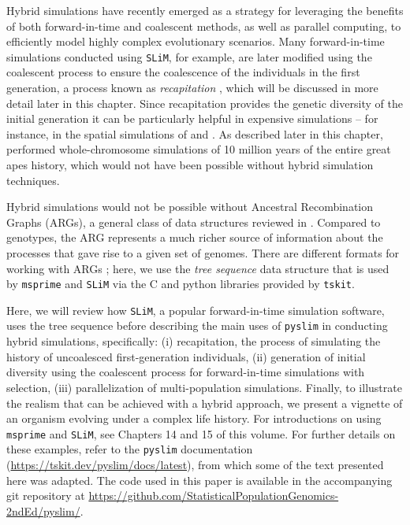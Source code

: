 \documentclass[12pt]{article}
\newcommand{\msprime}[0]{\texttt{msprime}\xspace}
\newcommand{\tskit}[0]{\texttt{tskit}\xspace}
\newcommand{\slim}[0]{\texttt{SLiM}\xspace}
\newcommand{\pyslim}[0]{\texttt{pyslim}\xspace}
\newcommand{\stdpopsim}[0]{\texttt{stdpopsim}\xspace}
\begin{document}
Hybrid simulations have recently emerged as a strategy for leveraging the benefits of both forward-in-time and coalescent methods, as well as parallel computing,
to efficiently model highly complex evolutionary scenarios.
Many forward-in-time simulations conducted using \slim, for example, are later modified using the coalescent process to ensure the coalescence of the individuals in the first generation, a process known as \emph{recapitation} \citep{kelleher_efficient_2018}, which will be discussed in more detail later in this chapter.
Since recapitation provides the genetic diversity of the initial generation
it can be particularly helpful in expensive simulations --
for instance,
in the spatial simulations of \citet{battey_space_2020} and \citet{petr_slendr_2023}.
As described later in this chapter,
\citet{rodrigues_shared_2024} performed whole-chromosome simulations of 10 million years of the entire great apes history,
which would not have been possible without hybrid simulation techniques.


Hybrid simulations would not be possible without Ancestral Recombination Graphs (ARGs), 
a general class of data structures reviewed in \citet{wong_general_2024}.
Compared to genotypes,
the ARG represents a much richer source of information about the processes that gave rise to a given set of genomes.
There are different formats for working with ARGs \citep{palamara2016argon,dehaas2024enabling,parida2011minimal,gunnarsson2024scalable};
here, we use the \emph{tree sequence} data structure \citep{kelleher_efficient_2016,ralph_efficiently_2020}
that is used by \msprime and \slim via the C and python libraries provided by \tskit.

Here, we will review how \slim, a popular forward-in-time simulation software, uses the tree sequence before describing
the main uses of \pyslim in conducting hybrid simulations, specifically:
(i) recapitation, the process of simulating the history of uncoalesced first-generation individuals,
(ii) generation of initial diversity using the coalescent process for forward-in-time simulations with selection,
(iii) parallelization of multi-population simulations.
Finally, to illustrate the realism that can be achieved with a hybrid approach, we present a vignette of an organism evolving under a complex life history.
For introductions on using \msprime and \slim,
see Chapters 14 and 15 of this volume.
For further details on these examples,
refer to the \pyslim{} documentation (\url{https://tskit.dev/pyslim/docs/latest}),
from which some of the text presented here was adapted.
The code used in this paper is available in the accompanying git repository at
\url{https://github.com/StatisticalPopulationGenomics-2ndEd/pyslim/}.
\end{document}
